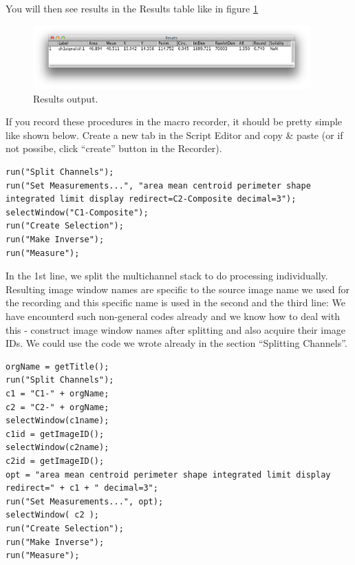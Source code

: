 You will then see results in the Results table like in figure \ref{fig_NucRimMeasureResults}

\begin{figure}[h!]
\begin{center}
\includegraphics[width=0.95\textwidth]{fig/MeasurementResults.png}
\caption{Results output.}
\label{fig_NucRimMeasureResults}
\end{center}
\end{figure}

If you record these procedures in the macro recorder, it should be pretty simple like shown below. Create a new tab in the Script Editor and copy \& paste (or if not possibe, click ``create'' button in the Recorder).

\begin{lstlisting}
run("Split Channels");
run("Set Measurements...", "area mean centroid perimeter shape integrated limit display redirect=C2-Composite decimal=3");
selectWindow("C1-Composite");
run("Create Selection");
run("Make Inverse");
run("Measure");
\end{lstlisting}

In the 1st line, we split the multichannel stack to do processing individually. Resulting image window names are specific to the source image name we used for the recording and this specific name is used in the second and the third line:  We have encounterd such non-general codes already and we know how to deal with this - construct image window names after splitting and also acquire their image IDs. We could use the code we wrote already in the section ``Splitting Channels''. 

\begin{lstlisting}[morekeywords={*, c1, c2, opt, getTitle}]
orgName = getTitle();
run("Split Channels");
c1 = "C1-" + orgName;
c2 = "C2-" + orgName;
selectWindow(c1name);
c1id = getImageID();
selectWindow(c2name);
c2id = getImageID();
opt = "area mean centroid perimeter shape integrated limit display redirect=" + c1 + " decimal=3";
run("Set Measurements...", opt);
selectWindow( c2 );
run("Create Selection");
run("Make Inverse");
run("Measure");
\end{lstlisting}

